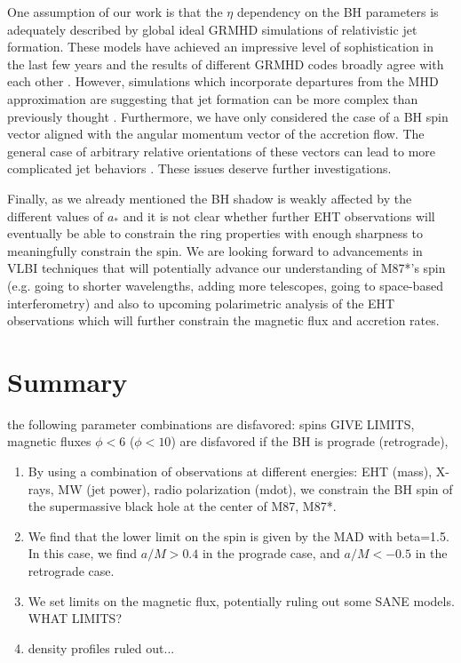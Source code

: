 \documentclass[twocolumn, linenumbers]{aastex62} %
\begin{document}

One assumption of our work is that the $\eta$ dependency on the BH parameters is adequately described by global ideal GRMHD simulations of relativistic jet formation. These models have achieved an impressive level of sophistication in the last few years and the results of different GRMHD codes broadly agree with each other . However, simulations which incorporate departures from the MHD approximation are suggesting that jet formation can be more complex than previously thought \citep{Parfrey2019}. Furthermore, we have only considered the case of a BH spin vector aligned with the angular momentum vector of the accretion flow. The general case of arbitrary relative orientations of these vectors can lead to more complicated jet behaviors \citep{Liska2018}. These issues deserve further investigations. 

Finally, as we already mentioned the BH shadow is weakly affected by the different values of $a_*$ and it is not clear whether further EHT observations will eventually be able to constrain the ring properties with enough sharpness to meaningfully constrain the spin. We are looking forward to advancements in VLBI techniques that will potentially advance our understanding of M87*'s spin (e.g. going to shorter wavelengths, adding more telescopes, going to space-based interferometry) and also to upcoming polarimetric analysis of the EHT observations which will further constrain the magnetic flux and accretion rates.




\section{Summary}	\label{sec:summary}

the following parameter combinations are disfavored: spins GIVE LIMITS, magnetic fluxes $\phi<6$ ($\phi<10$) are disfavored if the BH is prograde (retrograde), 

\begin{enumerate}
\item By using a combination of observations at different energies: EHT (mass), X-rays, MW (jet power), radio polarization (mdot), we constrain the BH spin of the supermassive black hole at the center of M87, M87*. 
\item We find that the lower limit on the spin is given by the MAD with beta=1.5. In this case, we find $a/M>0.4$ in the prograde case, and $a/M<-0.5$ in the retrograde case. 
\item We set limits on the magnetic flux, potentially ruling out some SANE models. WHAT LIMITS?
\item density profiles ruled out...
\end{enumerate}
\end{document}
